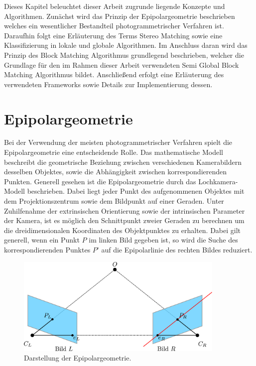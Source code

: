 Dieses Kapitel beleuchtet dieser Arbeit zugrunde liegende Konzepte und Algorithmen. Zunächst wird das Prinzip der Epipolargeometrie beschrieben welches ein wesentlicher Bestandteil photogrammetrischer Verfahren ist. Daraufhin folgt eine Erläuterung des Terms Stereo Matching sowie eine Klassifizierung in lokale und globale Algorithmen. Im Anschluss daran wird das Prinzip des Block Matching Algorithmus grundlegend beschrieben, welcher die Grundlage für den im Rahmen dieser Arbeit verwendeten Semi Global Block Matching Algorithmus bildet. Anschließend erfolgt eine Erläuterung des verwendeten Frameworks sowie Details zur Implementierung dessen.

\section{Epipolargeometrie}
\label{sec:epipolargeometrie}
Bei der Verwendung der meisten photogrammetrischer Verfahren spielt die Epipolargeometrie eine entscheidende Rolle. Das mathematische Modell beschreibt die geometrische Beziehung zwischen verschiedenen Kamerabildern desselben Objektes, sowie die Abhängigkeit zwischen korrespondierenden Punkten. Generell gesehen ist die Epipolargeometrie durch das Lochkamera-Modell beschrieben. Dabei liegt jeder Punkt des aufgenommenen Objektes mit dem Projektionszentrum sowie dem Bildpunkt auf einer Geraden. Unter Zuhilfenahme der extrinsischen Orientierung sowie der intrinsischen Parameter der Kamera, ist es möglich den Schnittpunkt zweier Geraden zu berechnen um die dreidimensionalen Koordinaten des Objektpunktes zu erhalten. Dabei gilt generell, wenn ein Punkt $P$ im linken Bild gegeben ist, so wird die Suche des korrespondierenden Punktes $P’$ auf die Epipolarlinie des rechten Bildes reduziert. 

\begin{figure}
	\begin{center}
		\includegraphics[width=10cm]{img/epipolar_geometry.pdf}
	\end{center}
	\caption{Darstellung der Epipolargeometrie.}
	\label{fig:epipolar_geometry}
\end{figure}

